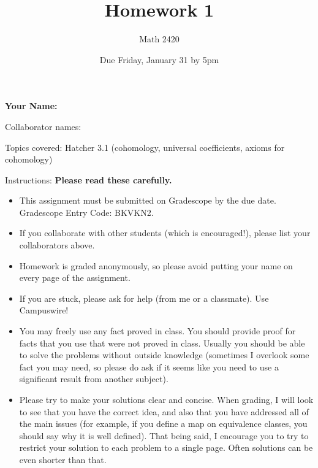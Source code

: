 \documentclass[11pt]{article}
\author{Math 2420}
\date{Due Friday, January 31 by 5pm}
\title{Homework 1}
\begin{document}
\maketitle

{\bf\Large Your Name:} 

Collaborator names: 


\vspace{.3in}
Topics covered: Hatcher 3.1 (cohomology, universal coefficients, axioms for cohomology)

Instructions: {\bf Please read these carefully.} 
\begin{itemize}
\item This assignment must be submitted on Gradescope by the due date. Gradescope Entry Code: BKVKN2. 
\item If you collaborate with other students (which is encouraged!), please list your collaborators above. 
\item Homework is graded anonymously, so please avoid putting your name on every page of the assignment.
\item If you are stuck, please ask for help (from me or a classmate). Use Campuswire!  
\item You may freely use any fact proved in class. You should provide proof for facts that you use that were not proved in class. Usually you should be able to solve the problems without outside knowledge (sometimes I overlook some fact you may need, so please do ask if it seems like you need to use a significant result from another subject). 
\item Please try to make your solutions clear and concise. When grading, I will look to see that you have the correct idea, and also that you have addressed all of the main issues (for example, if you define a map on equivalence classes, you should say why it is well defined). That being said, I encourage you to try to restrict your solution to each problem to a single page. Often solutions can be even shorter than that. 
\end{itemize}
\pagebreak 




\pagebreak 
\end{document}
